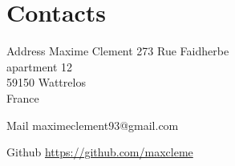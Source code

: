 \documentclass[hidelinks]{cv-style}          %
\begin{document}

\section{Contacts}

\begin{entrylist}
\entry
  {Address}
  {Maxime Clement}
  {}
  {
  273 Rue Faidherbe\\
apartment 12\\
59150 Wattrelos\\
France\\
}

\entry
  {Mail}
  {maximeclement93@gmail.com}
  {}
  {}
  
\entry
  {Github}
  {\url{https://github.com/maxcleme}}
  {}
  {}
\end{entrylist}
\end{document}
